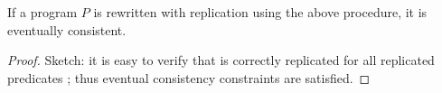
\begin{theorem}
If a program $P$ is rewritten with replication using the above procedure, it is eventually consistent.
\end{theorem}
\begin{proof}
Sketch: it is easy to verify that  is correctly replicated for all replicated predicates ; thus eventual consistency constraints are satisfied.
\end{proof}
